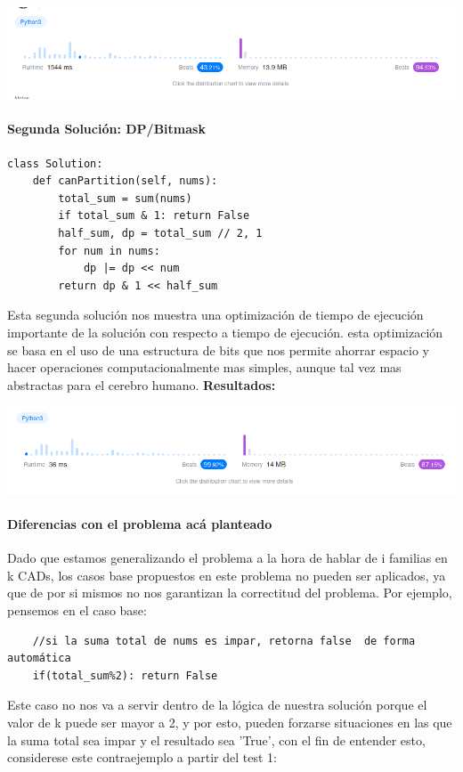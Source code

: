 \documentclass[a4paper]{article}
\begin{document}
\includegraphics[scale=0.7]{R1.png}

\paragraph{Segunda Solución: DP/Bitmask}
\begin{verbatim}
class Solution:
    def canPartition(self, nums):
        total_sum = sum(nums)
        if total_sum & 1: return False
        half_sum, dp = total_sum // 2, 1
        for num in nums:
            dp |= dp << num
        return dp & 1 << half_sum
\end{verbatim}

Esta segunda solución nos muestra una optimización de tiempo de ejecución importante
de la solución con respecto a tiempo de ejecución. esta optimización se basa en el uso
de una estructura de bits que nos permite ahorrar espacio y hacer operaciones computacionalmente
mas simples, aunque tal vez mas abstractas para el cerebro humano.
\textbf{Resultados:}

\includegraphics[scale=0.7]{R2.png}

\paragraph{Diferencias con el problema acá planteado}
Dado que estamos generalizando el problema a la hora de hablar de i familias en k CADs, los
casos base propuestos en este problema no pueden ser aplicados, ya que de por si mismos no 
nos garantizan la correctitud del problema. Por ejemplo, pensemos en el caso base:
\begin{verbatim}
    //si la suma total de nums es impar, retorna false  de forma automática
    if(total_sum%2): return False 
\end{verbatim}
Este caso no nos va a servir dentro de la lógica de nuestra solución porque el 
valor de k puede ser mayor a 2, y por esto, pueden forzarse situaciones en las que la suma total
sea impar y el resultado sea 'True', con el fin de entender esto, considerese este
contraejemplo a partir del test 1:
\end{document}
